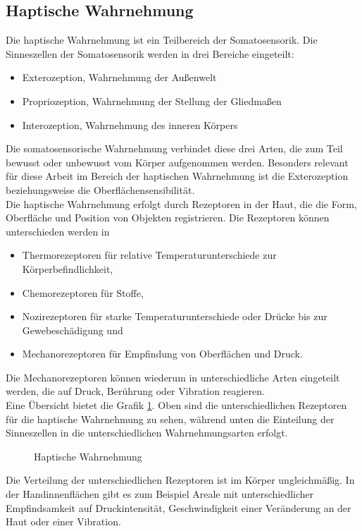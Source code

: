 \subsection{Haptische Wahrnehmung}
Die haptische Wahrnehmung ist ein Teilbereich der Somatosensorik. Die Sinneszellen der Somatosensorik werden in drei Bereiche eingeteilt:
\begin{itemize}
	\item Exterozeption, Wahrnehmung der Außenwelt
	\item Propriozeption, Wahrnehmung der Stellung der Gliedmaßen
	\item Interozeption, Wahrnehmung des inneren Körpers
\end{itemize}
Die somatosensorische Wahrnehmung verbindet diese drei Arten, die zum Teil bewusst oder unbewusst vom Körper aufgenommen werden. Besonders relevant für diese Arbeit im Bereich der haptischen Wahrnehmung ist die Exterozeption beziehungsweise die Oberflächensensibilität. \cite[Vgl. Seite 26]{Sprenger.2020}\\
Die haptische Wahrnehmung erfolgt durch Rezeptoren in der Haut, die die Form, Oberfläche und Position von Objekten registrieren. Die Rezeptoren können unterschieden werden in
\begin{itemize}
	\item Thermorezeptoren für relative Temperaturunterschiede zur Körperbefindlichkeit, 
	\item Chemorezeptoren für Stoffe,
	\item Nozirezeptoren für starke Temperaturunterschiede oder Drücke bis zur Gewebeschädigung und
	\item Mechanorezeptoren für Empfindung von Oberflächen und Druck.
\end{itemize}
Die Mechanorezeptoren können wiederum in unterschiedliche Arten eingeteilt werden, die auf Druck, Berührung oder Vibration reagieren. \cite[Vgl. Seite 26 f.]{Sprenger.2020} \\
Eine Übersicht bietet die Grafik \ref{fig:hapWahrnehmung}. Oben sind die unterschiedlichen Rezeptoren für die haptische Wahrnehmung zu sehen, während unten die Einteilung der Sinneszellen in die unterschiedlichen Wahrnehmungsarten erfolgt.
\begin{figure}[hbt]
	\centering
	
	\caption[Haptische Wahrnehmung]{Haptische Wahrnehmung}
	\label{fig:hapWahrnehmung}
\end{figure}
Die Verteilung der unterschiedlichen Rezeptoren ist im Körper ungleichmäßig. In der Handinnenflächen gibt es zum Beispiel Areale mit unterschiedlicher Empfindsamkeit \glqq auf Druckintensität, Geschwindigkeit einer Veränderung an der Haut oder einer Vibration. \grqq{} \cite[Seite 29]{Sprenger.2020}\\

